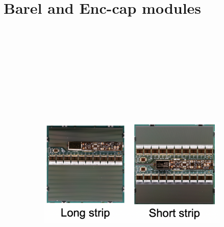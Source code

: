 \newpage
\section{Barel and Enc-cap modules}
\begin{figure}[h]
    \begin{subfigure}[b]{1\textwidth}
        \centering
        \includegraphics[width=14cm,height=15cm,keepaspectratio]{Figures/modules/Barrel_Modules.png}
        \caption{}\label{fig:barrel}
    \end{subfigure}
    \\
    \begin{subfigure}[b]{1\textwidth}
        \centering

\end{subfigure}
\end{figure}
